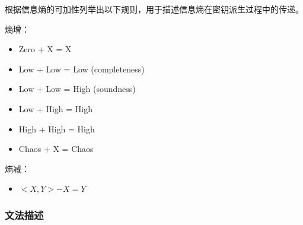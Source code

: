 \documentclass[UTF8]{ctexart}
\begin{document}
根据信息熵的可加性列举出以下规则，用于描述信息熵在密钥派生过程中的传递。

熵增：
\begin{itemize}
    \item Zero + X = X
    \item Low + Low = Low (completeness)
    \item Low + Low = High (soundness)
    \item Low + High = High
    \item High + High = High
    \item Chaos + X = Chaos
\end{itemize}

熵减：
\begin{itemize}
    \item $<X, Y> - X = Y$
\end{itemize}

\subsubsection{文法描述}



\end{document}
